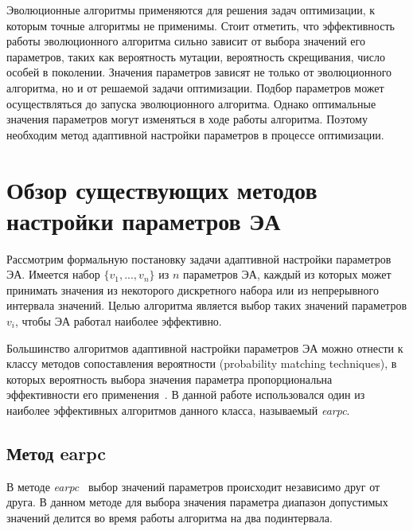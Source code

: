 Эволюционные алгоритмы применяются для решения задач оптимизации, к которым точные алгоритмы не применимы. Стоит отметить, что эффективность работы эволюционного алгоритма сильно зависит от выбора значений его параметров, таких как вероятность мутации, вероятность скрещивания, число особей в поколении. Значения параметров зависят не только от эволюционного алгоритма, но и от решаемой задачи оптимизации. Подбор параметров может осуществляться до запуска эволюционного алгоритма. Однако оптимальные значения параметров могут изменяться в ходе работы алгоритма. Поэтому необходим метод адаптивной настройки параметров в процессе оптимизации.

\section{Обзор существующих методов настройки параметров ЭА}

Рассмотрим формальную постановку задачи адаптивной настройки параметров ЭА. Имеется набор $\{v_1, ..., v_n\}$ из $n$ параметров ЭА, каждый из которых может принимать значения из некоторого дискретного набора или из непрерывного интервала значений. Целью алгоритма является выбор таких значений параметров $v_i$, чтобы ЭА работал наиболее эффективно.

Большинство алгоритмов адаптивной настройки параметров ЭА можно отнести к классу методов сопоставления  вероятности (probability matching techniques), в которых вероятность выбора значения параметра пропорциональна эффективности его применения~\cite{eiben_1}. В данной работе использовался один из наиболее эффективных алгоритмов данного класса, называемый \textit{earpc}.

\subsection{Метод earpc}
\label{earpc}
В методе \textit{earpc}~\cite{earpc} выбор значений параметров происходит независимо друг от друга. В данном методе для выбора значения параметра диапазон допустимых значений делится во время работы алгоритма на два подинтервала.

